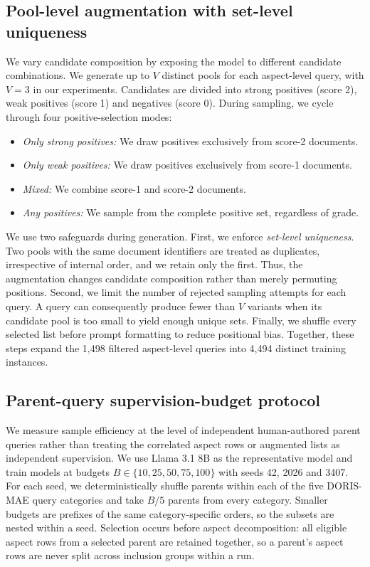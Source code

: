 \documentclass[pdflatex,sn-basic,Numbered]{sn-jnl}%
\theoremstyle{thmstyleone}%
\theoremstyle{thmstyletwo}%
\theoremstyle{thmstylethree}%
\begin{document}
\subsection{Pool-level augmentation with set-level uniqueness}

We vary candidate composition by exposing the model to different candidate
combinations. We generate up to $V$ distinct pools for each aspect-level
query, with $V = 3$ in our experiments. Candidates are divided into strong
positives (score 2), weak positives (score 1) and negatives (score 0). During
sampling, we cycle through four positive-selection modes:
\begin{itemize}
\item \textit{Only strong positives:} We draw positives exclusively from score-2
documents.
\item \textit{Only weak positives:} We draw positives exclusively from score-1
documents.
\item \textit{Mixed:} We combine score-1 and score-2 documents.
\item \textit{Any positives:} We sample from the complete positive set, regardless
of grade.
\end{itemize}
We use two safeguards during generation. First, we enforce \emph{set-level
uniqueness}. Two pools with the same document identifiers are treated as
duplicates, irrespective of internal order, and we retain only the first. Thus, the
augmentation changes candidate composition rather than merely permuting
positions. Second, we limit the number of rejected sampling attempts for each
query. A query can consequently produce fewer than $V$ variants when its
candidate pool is too small to yield enough unique sets. Finally, we shuffle every
selected list before prompt formatting to reduce positional bias. Together, these
steps expand the 1,498 filtered aspect-level queries into 4,494 distinct training
instances.

\subsection{Parent-query supervision-budget protocol}
\label{sec:parent-budget-protocol}

We measure sample efficiency at the level of independent human-authored parent
queries rather than treating the correlated aspect rows or augmented lists as
independent supervision. We use Llama 3.1 8B as the representative model and
train models at budgets $B\in\{10,25,50,75,100\}$ with seeds 42, 2026 and 3407. For each
seed, we deterministically shuffle parents within each of the five DORIS-MAE
query categories and take $B/5$ parents from every category. Smaller budgets are
prefixes of the same category-specific orders, so the subsets are nested within a
seed. Selection occurs before aspect decomposition: all eligible aspect rows from
a selected parent are retained together, so a parent's aspect rows are never
split across inclusion groups within a run.
\end{document}
